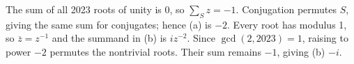 The sum of all 2023 roots of unity is 0, so $\sum_{S}z=-1 $. Conjugation permutes $ S $, giving the same sum for conjugates; hence (a) is $\boxed{-2}$. Every root has modulus 1, so $\overline z=z^{-1}$ and the summand in (b) is $ iz^{-2}$. Since $\gcd(2,2023)=1 $, raising to power $-2 $ permutes the nontrivial roots. Their sum remains $-1 $, giving (b) $\boxed{-i}$.
